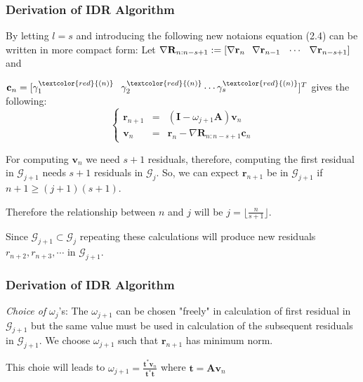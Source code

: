 \documentclass[mathserif]{beamer}
\begin{document}
\begin{frame}
\frametitle{Derivation of IDR Algorithm}
By letting $l=s$ and introducing the following new notaions equation (2.4) can be written in more compact form:
\pause
\vspace{.1in}
Let $\nabla \mathbf{R}_{n:n-s+1}:=[\nabla \mathbf{r}_n \hspace{.1in} \nabla \mathbf{r}_{n-1} \hspace{.1in}  \cdots \hspace{.1in} \nabla \mathbf{r}_{n-s+1}  ]$ and 

$\mathbf{c}_n=[\gamma_1 ^ {\textcolor{red}{{(n)}}} \hspace{.1in} \gamma_2 ^ {\textcolor{red}{{(n)}}} \cdots \gamma_s ^ {\textcolor{red}{{(n)}}}]^T$ gives the following:
\pause
\[\left\{ \tag{2.5}\begin{array}{llll} \mathbf{r}_{n+1} &=& (\mathbf{I}-\omega_{j+1} \mathbf{A}) \mathbf{v}_n\\ \mathbf{v}_n&=&\mathbf{r}_n-\nabla \mathbf{R}_{n:n-s+1}\mathbf{c}_n\end{array}\right.\]
\pause

For computing $\mathbf{v}_n$ we need $s+1$ residuals, therefore, computing the first residual in $\mathcal{G}_{j+1}$ needs $s+1$ residuals in $\mathcal{G}_j.$ So, we can expect $\mathbf{r}_{n+1}$ be in $\mathcal{G}_{j+1}$  if $n+1 \ge (j+1)(s+1)$. 

\pause
\vspace{.1in}
Therefore the relationship between $n$ and $j$ will be $j=\lfloor{\frac{n}{s+1}}\rfloor$.

\pause Since $\mathcal{G}_{j+1} \subset \mathcal{G}_j$ repeating these calculations will produce new residuals $r_{n+2}, r_{n+3},  \cdots$ in $\mathcal{G}_{j+1}.$
\end{frame}

\begin{frame}
\frametitle{Derivation of IDR Algorithm}
\textit{Choice of} $\omega_j$'s: The $\omega_{j+1}$ can be chosen "freely" in calculation of first residual in $\mathcal{G}_{j+1}$ but the same value must be used in calculation of the subsequent residuals in $\mathcal{G}_{j+1}.$ We choose $\omega_{j+1}$ such that $\mathbf{r}_{n+1}$ has  minimum norm. \\
\vspace{.1in}

This choie will leads to $\omega_{j+1}=\frac{\mathbf{t}^*\mathbf{v}_n}{\mathbf{t}^*\mathbf{t}}$ where $\mathbf{t}=\mathbf{A}\mathbf{v}_n$
\end{frame}
\end{document}
